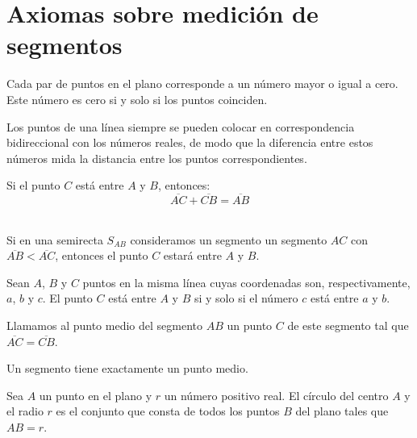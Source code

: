 \chapter{Axiomas sobre medición de segmentos}

\begin{axioma}
    Cada par de puntos en el plano corresponde a un número mayor o igual a cero. Este número es cero si y solo si los puntos coinciden.\\
\end{axioma}

\begin{axioma}
    Los puntos de una línea siempre se pueden colocar en correspondencia bidireccional con los números reales, de modo que la diferencia entre estos números mida la distancia entre los puntos correspondientes.\\
\end{axioma}

\begin{axioma}
   Si el punto $C$ está entre $A$ y $B$, entonces:  $$\overline{AC} + \overline{CB} = \overline{AB}$$\\
\end{axioma}

	\begin{proposicion}
	    Si en una semirecta $S_{AB}$ consideramos un segmento un segmento $AC$ con $\overline{AB} < \overline{AC}$, entonces el punto $C$ estará entre $A$ y $B$.\\
	\end{proposicion}

    \begin{teo}
	Sean $A$, $B$ y $C$ puntos en la misma línea cuyas coordenadas son, respectivamente, $a$, $b$ y $c$. El punto $C$ está entre $A$ y $B$ si y solo si el número $c$ está entre $a$ y $b$.\\
    \end{teo}

    \begin{def.}
	Llamamos al punto medio del segmento $AB$  un punto $C$ de este segmento tal que $\overline{AC} = \overline{CB}$.\\
    \end{def.}

    \begin{teo}
	Un segmento tiene exactamente un punto medio.\\
    \end{teo}

    \begin{def.}
	Sea $A$ un punto en el plano y $r$ un número positivo real. El círculo del centro $A$ y el radio $r$ es el conjunto que consta de todos los puntos $B$ del plano tales que $AB = r$.\\
    \end{def.}
